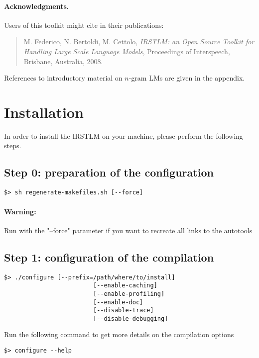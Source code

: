 \documentclass[11pt]{article}
\begin{document}
\paragraph{Acknowledgments.}Users of this toolkit  might cite in their publications:
\begin{quote}
M. Federico,  N. Bertoldi,  M. Cettolo, {\em IRSTLM: an Open Source Toolkit for Handling Large Scale Language Models}, Proceedings of Interspeech, Brisbane, Australia, 2008.
\end{quote}

\noindent
References to introductory material on $n$-gram LMs are given in the appendix. 


\newpage
\section{Installation}
\label{sec:installation}
In order to install the IRSTLM on your machine, please perform the following steps.

\subsection{Step 0: preparation of the configuration}
\begin{verbatim}
$> sh regenerate-makefiles.sh [--force]
\end{verbatim}

\paragraph{Warning:} Run with the "--force" parameter if you want to recreate all links to the autotools

\subsection{Step 1: configuration of the compilation}
\begin{verbatim}
$> ./configure [--prefix=/path/where/to/install]
                         [--enable-caching] 
                         [--enable-profiling]
                         [--enable-doc]
                         [--disable-trace]
                         [--disable-debugging]
\end{verbatim}

\noindent
Run the following command to get more details on the compilation options
\begin{verbatim}
$> configure --help
\end{verbatim}
\end{document}

